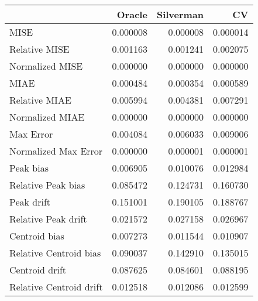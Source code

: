 \begin{tabular}{lrrr}
  \hline
 & Oracle & Silverman & CV \\ 
  \hline
MISE & 0.000008 & 0.000008 & 0.000014 \\ 
  Relative MISE & 0.001163 & 0.001241 & 0.002075 \\ 
  Normalized MISE & 0.000000 & 0.000000 & 0.000000 \\ 
  MIAE & 0.000484 & 0.000354 & 0.000589 \\ 
  Relative MIAE & 0.005994 & 0.004381 & 0.007291 \\ 
  Normalized MIAE & 0.000000 & 0.000000 & 0.000000 \\ 
  Max Error & 0.004084 & 0.006033 & 0.009006 \\ 
  Normalized Max Error & 0.000000 & 0.000001 & 0.000001 \\ 
  Peak bias & 0.006905 & 0.010076 & 0.012984 \\ 
  Relative Peak bias & 0.085472 & 0.124731 & 0.160730 \\ 
  Peak drift & 0.151001 & 0.190105 & 0.188767 \\ 
  Relative Peak drift & 0.021572 & 0.027158 & 0.026967 \\ 
  Centroid bias & 0.007273 & 0.011544 & 0.010907 \\ 
  Relative Centroid bias & 0.090037 & 0.142910 & 0.135015 \\ 
  Centroid drift & 0.087625 & 0.084601 & 0.088195 \\ 
  Relative Centroid drift & 0.012518 & 0.012086 & 0.012599 \\ 
   \hline
\end{tabular}
